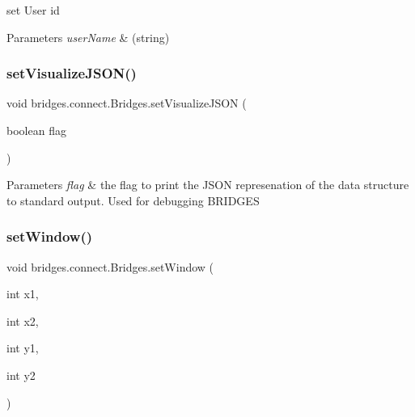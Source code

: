 set User id


\begin{DoxyParams}{Parameters}
{\em user\+Name} & (string) \\
\hline
\end{DoxyParams}
\mbox{\label{classbridges_1_1connect_1_1_bridges_aa502aa32a9ac482da9c8455c6810b64d}} 
\subsubsection{\texorpdfstring{set\+Visualize\+J\+S\+O\+N()}{setVisualizeJSON()}}
{\footnotesize\ttfamily void bridges.\+connect.\+Bridges.\+set\+Visualize\+J\+S\+ON (\begin{DoxyParamCaption}\item[{boolean}]{flag }\end{DoxyParamCaption})}


\begin{DoxyParams}{Parameters}
{\em flag} & the flag to print the J\+S\+ON represenation of the data structure to standard output. Used for debugging B\+R\+I\+D\+G\+ES \\
\hline
\end{DoxyParams}
\mbox{\label{classbridges_1_1connect_1_1_bridges_ac2f9a8d7852e499a7ed3521f06d470bf}} 
\subsubsection{\texorpdfstring{set\+Window()}{setWindow()}\hspace{0.1cm}{\footnotesize\ttfamily [1/3]}}
{\footnotesize\ttfamily void bridges.\+connect.\+Bridges.\+set\+Window (\begin{DoxyParamCaption}\item[{int}]{x1,  }\item[{int}]{x2,  }\item[{int}]{y1,  }\item[{int}]{y2 }\end{DoxyParamCaption})}



